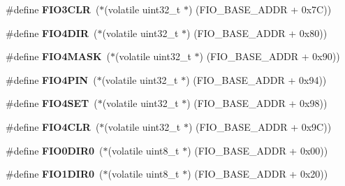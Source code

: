 \begin{DoxyCompactItemize}
\item 
\mbox{\label{group__lpc24xx__regs_gab64a776a181a354a850222009357a294}} 
\#define {\bfseries F\+I\+O3\+C\+LR}~($\ast$(volatile uint32\+\_\+t $\ast$) (F\+I\+O\+\_\+\+B\+A\+S\+E\+\_\+\+A\+D\+DR + 0x7\+C))
\item 
\mbox{\label{group__lpc24xx__regs_gaf2517ae60d5d5039a5218bcd6a4ca3d1}} 
\#define {\bfseries F\+I\+O4\+D\+IR}~($\ast$(volatile uint32\+\_\+t $\ast$) (F\+I\+O\+\_\+\+B\+A\+S\+E\+\_\+\+A\+D\+DR + 0x80))
\item 
\mbox{\label{group__lpc24xx__regs_ga58bbc88f8e37e7c69525a3ed50b13647}} 
\#define {\bfseries F\+I\+O4\+M\+A\+SK}~($\ast$(volatile uint32\+\_\+t $\ast$) (F\+I\+O\+\_\+\+B\+A\+S\+E\+\_\+\+A\+D\+DR + 0x90))
\item 
\mbox{\label{group__lpc24xx__regs_gaeaa168fd9ed723f7755daeb0ada32477}} 
\#define {\bfseries F\+I\+O4\+P\+IN}~($\ast$(volatile uint32\+\_\+t $\ast$) (F\+I\+O\+\_\+\+B\+A\+S\+E\+\_\+\+A\+D\+DR + 0x94))
\item 
\mbox{\label{group__lpc24xx__regs_ga3ea2ecaf667403aca71e0fee158e7e4a}} 
\#define {\bfseries F\+I\+O4\+S\+ET}~($\ast$(volatile uint32\+\_\+t $\ast$) (F\+I\+O\+\_\+\+B\+A\+S\+E\+\_\+\+A\+D\+DR + 0x98))
\item 
\mbox{\label{group__lpc24xx__regs_ga6a284339302a53d41530effeafb6663d}} 
\#define {\bfseries F\+I\+O4\+C\+LR}~($\ast$(volatile uint32\+\_\+t $\ast$) (F\+I\+O\+\_\+\+B\+A\+S\+E\+\_\+\+A\+D\+DR + 0x9\+C))
\item 
\mbox{\label{group__lpc24xx__regs_ga6024dedde806219cdc13ac2448e517f7}} 
\#define {\bfseries F\+I\+O0\+D\+I\+R0}~($\ast$(volatile uint8\+\_\+t $\ast$) (F\+I\+O\+\_\+\+B\+A\+S\+E\+\_\+\+A\+D\+DR + 0x00))
\item 
\mbox{\label{group__lpc24xx__regs_ga1a942184d612559007652f84d7fcc00d}} 
\#define {\bfseries F\+I\+O1\+D\+I\+R0}~($\ast$(volatile uint8\+\_\+t $\ast$) (F\+I\+O\+\_\+\+B\+A\+S\+E\+\_\+\+A\+D\+DR + 0x20))
\item 
\mbox{\label{group__lpc24xx__regs_ga8371e85b27106e24eed2eec806e7572e}} 

\end{DoxyCompactItemize}

